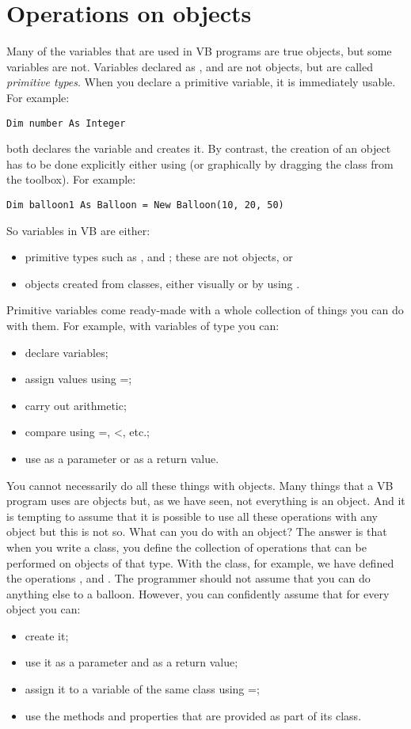 	\section{Operations on objects}
		Many of the variables that are used in VB programs are true objects, but some variables are not. Variables declared as ,  and  are not objects, but are called \emph{primitive types}. When you declare a primitive variable, it is immediately usable. For example:
		\begin{lstlisting}
Dim number As Integer
		\end{lstlisting}
		both declares the variable  and creates it. By contrast, the creation of an object has to be done explicitly either using  (or graphically by dragging the class from the toolbox). For example:
		\begin{lstlisting}
Dim balloon1 As Balloon = New Balloon(10, 20, 50)
		\end{lstlisting}
		So variables in VB are either:
		\begin{itemize}
			\item primitive types such as ,  and ; these are not objects, or
      \item objects created from classes, either visually or by using .
		\end{itemize}
		Primitive variables come ready-made with a whole collection of things you can do with them. For example, with variables of type  you can:
		\begin{itemize}
      \item declare variables;
      \item assign values using =;
      \item carry out arithmetic;
      \item compare using =, <, etc.;
      \item use as a parameter or as a return value.
		\end{itemize}
		You cannot necessarily do all these things with objects. Many things that a VB program uses are objects but, as we have seen, not everything is an object. And it is tempting to assume that it is possible to use all these operations with any object but this is not so. What can you do with an object? The answer is that when you write a class, you define the collection of operations that can be performed on objects of that type. With the  class, for example, we have defined the operations ,  and . The programmer should not assume that you can do anything else to a balloon. However, you can confidently assume that for every object you can:
		\begin{itemize}
      \item create it;
      \item use it as a parameter and as a return value;
      \item assign it to a variable of the same class using =;
      \item use the methods and properties that are provided as part of its class.
		\end{itemize}

